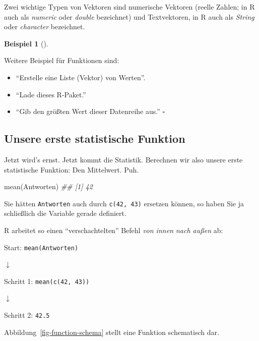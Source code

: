 \documentclass[
  letterpaper,
]{scrbook}
\newenvironment{Shaded}{\begin{snugshade}}{\end{snugshade}}
\newcommand{\DocumentationTok}[1]{\textcolor[rgb]{0.37,0.37,0.37}{\textit{#1}}}
\newcommand{\FunctionTok}[1]{\textcolor[rgb]{0.28,0.35,0.67}{#1}}
\newcommand{\NormalTok}[1]{\textcolor[rgb]{0.00,0.23,0.31}{#1}}
\providecommand{\tightlist}{%
  \setlength{\itemsep}{0pt}\setlength{\parskip}{0pt}}\usepackage{longtable,booktabs,array}
\theoremstyle{definition}
\theoremstyle{definition}
\newtheorem{example}{Beispiel}[chapter]
\theoremstyle{definition}
\theoremstyle{remark}
\begin{document}
Zwei wichtige Typen von Vektoren sind numerische Vektoren (reelle
Zahlen; in R auch als \emph{numeric} oder \emph{double} bezeichnet) und
Textvektoren, in R auch als \emph{String} oder \emph{character}
bezeichnet.

\begin{example}[]\protect\hypertarget{exm-funs}{}\label{exm-funs}

Weitere Beispiel für Funktionen sind:

\begin{itemize}
\tightlist
\item
  \enquote{Erstelle eine Liste (Vektor) von Werten}.
\item
  \enquote{Lade dieses R-Paket.}
\item
  \enquote{Gib den größten Wert dieser Datenreihe aus.} \(\square\)
\end{itemize}

\end{example}

\subsection{Unsere erste statistische Funktion}\label{sec-first-fun}

Jetzt wird's ernst. Jetzt kommt die Statistik. Berechnen wir also unsere
erste statistische Funktion: Den Mittelwert. Puh.

\begin{Shaded}
\begin{Highlighting}[]
\FunctionTok{mean}\NormalTok{(Antworten)}
\DocumentationTok{\#\# [1] 42}
\end{Highlighting}
\end{Shaded}

Sie hätten \texttt{Antworten} auch durch \texttt{c(42,\ 43)} ersetzen
können, so haben Sie ja schließlich die Variable gerade definiert.

R arbeitet so einen \enquote{verschachtelten} Befehl \emph{von innen
nach außen} ab:

Start: \texttt{mean(Antworten)}

{\(\downarrow\)}

Schritt 1: \texttt{mean(c(42,\ 43))}

{\(\downarrow\)}

Schritt 2: \texttt{42.5}

Abbildung~\ref{fig-function-schema} stellt eine Funktion schematisch
dar.
\end{document}
